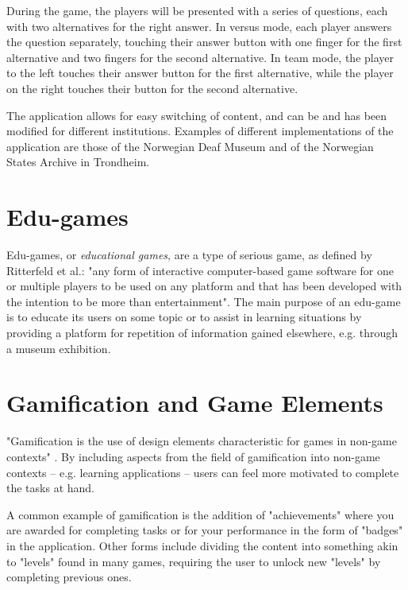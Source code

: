During the game, the players will be presented with a series of questions, each with two alternatives for the right answer. In versus mode, each player answers the question separately, touching their answer button with one finger for the first alternative and two fingers for the second alternative. In team mode, the player to the left touches their answer button for the first alternative, while the player on the right touches their button for the second alternative.

The application allows for easy switching of content, and can be and has been modified for different institutions. Examples of different implementations of the application are those of the Norwegian Deaf Museum and of the Norwegian States Archive in Trondheim.


\section{Edu-games}

Edu-games, or \emph{educational games}, are a type of serious game, as defined by Ritterfeld et al.: "any form of interactive computer-based game software for one or multiple players to be used on any platform and that has been developed with the intention to be more than entertainment"\cite{Ritterfeld}. The main purpose of an edu-game is to educate its users on some topic or to assist in learning situations by providing a platform for repetition of information gained elsewhere, e.g. through a museum exhibition.


\section{Gamification and Game Elements}

"Gamification is the use of design elements characteristic for games in non-game contexts" \citep{Deterding}. By including aspects from the field of gamification into non-game contexts – e.g. learning applications – users can feel more motivated to complete the tasks at hand.

A common example of gamification is the addition of "achievements" where you are awarded for completing tasks or for your performance in the form of "badges" in the application. Other forms include dividing the content into something akin to "levels" found in many games, requiring the user to unlock new "levels" by completing previous ones.